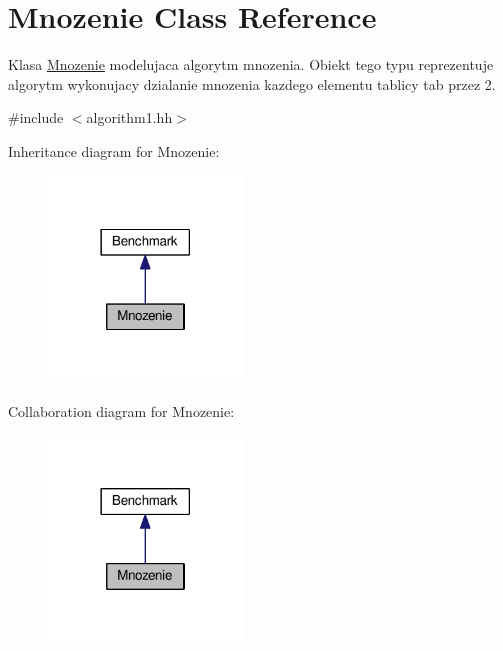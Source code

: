 \hypertarget{class_mnozenie}{}\section{Mnozenie Class Reference}
\label{class_mnozenie}


Klasa \hyperlink{class_mnozenie}{Mnozenie} modelujaca algorytm mnozenia. Obiekt tego typu reprezentuje algorytm wykonujacy dzialanie mnozenia kazdego elementu tablicy tab przez 2.  




{\ttfamily \#include $<$algorithm1.\+hh$>$}



Inheritance diagram for Mnozenie\+:\nopagebreak
\begin{figure}[H]
\begin{center}
\leavevmode
\includegraphics[width=146pt]{class_mnozenie__inherit__graph}
\end{center}
\end{figure}


Collaboration diagram for Mnozenie\+:\nopagebreak
\begin{figure}[H]
\begin{center}
\leavevmode
\includegraphics[width=146pt]{class_mnozenie__coll__graph}
\end{center}
\end{figure}
